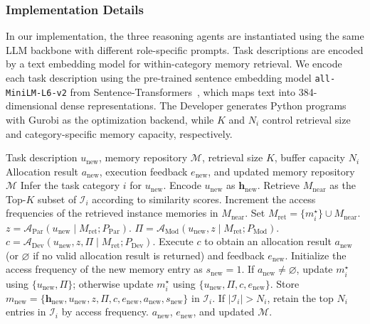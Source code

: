 \documentclass[letterpaper,journal]{IEEEtran}
\begin{document}
\subsubsection{Implementation Details}
In our implementation, the three reasoning agents are instantiated using the same LLM backbone with different role-specific prompts. Task descriptions are encoded by a text embedding model for within-category memory retrieval. We encode each task description using the pre-trained sentence embedding model \texttt{all-MiniLM-L6-v2} from Sentence-Transformers~\cite{reimers2019sentencebert}, which maps text into 384-dimensional dense representations. The Developer generates Python programs with Gurobi as the optimization backend, while \(K\) and \(N_i\) control retrieval size and category-specific memory capacity, respectively.


\begin{algorithm}[t]
\caption{EMERGE Inference and Memory Evolution}
\label{alg:emerge}
\begin{algorithmic}[1]
\REQUIRE Task description $u_{\mathrm{new}}$, memory repository $\mathcal{M}$, retrieval size $K$, buffer capacity $N_i$
\ENSURE Allocation result $a_{\mathrm{new}}$, execution feedback $e_{\mathrm{new}}$, and updated memory repository $\mathcal{M}$
\STATE Infer the task category $i$ for $u_{\mathrm{new}}$.
\STATE Encode $u_{\mathrm{new}}$ as $\mathbf{h}_{\mathrm{new}}$.
\STATE Retrieve $M_{\mathrm{near}}$ as the Top-$K$ subset of $\mathcal{I}_i$ according to similarity scores.
\STATE Increment the access frequencies of the retrieved instance memories in $M_{\mathrm{near}}$.
\STATE Set $M_{\mathrm{ret}}=\{m_i^{\star}\}\cup M_{\mathrm{near}}$.
\STATE $z=\mathcal{A}_{\mathrm{Par}}(u_{\mathrm{new}}\mid M_{\mathrm{ret}};P_{\mathrm{Par}})$.
\STATE $\Pi=\mathcal{A}_{\mathrm{Mod}}(u_{\mathrm{new}},z\mid M_{\mathrm{ret}};P_{\mathrm{Mod}})$.
\STATE $c=\mathcal{A}_{\mathrm{Dev}}(u_{\mathrm{new}},z,\Pi\mid M_{\mathrm{ret}};P_{\mathrm{Dev}})$.
\STATE Execute $c$ to obtain an allocation result $a_{\mathrm{new}}$ (or $\varnothing$ if no valid allocation result is returned) and feedback $e_{\mathrm{new}}$.
\STATE Initialize the access frequency of the new memory entry as $s_{\mathrm{new}}=1$.
\STATE If $a_{\mathrm{new}}\neq \varnothing$, update $m_i^{\star}$ using $\{u_{\mathrm{new}},\Pi\}$; otherwise update $m_i^{\star}$ using $\{u_{\mathrm{new}},\Pi,c,e_{\mathrm{new}}\}$.
\STATE Store $m_{\mathrm{new}}=\{\mathbf{h}_{\mathrm{new}},u_{\mathrm{new}},z,\Pi,c,e_{\mathrm{new}},a_{\mathrm{new}},s_{\mathrm{new}}\}$ in $\mathcal{I}_i$.
\STATE If $|\mathcal{I}_i|>N_i$, retain the top $N_i$ entries in $\mathcal{I}_i$ by access frequency.
\RETURN $a_{\mathrm{new}}$, $e_{\mathrm{new}}$, and updated $\mathcal{M}$.
\end{algorithmic}
\end{algorithm}
\end{document}

